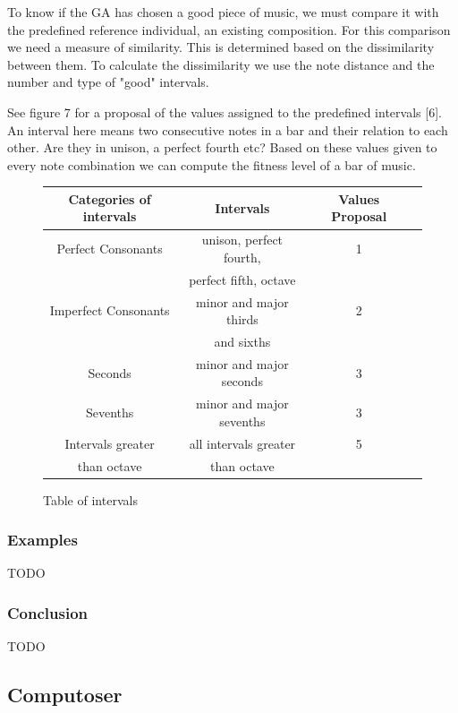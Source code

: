 \documentclass[12pt]{article}
\begin{document}
To know if the GA has chosen a good piece of music, we must compare it with the predefined reference individual, an existing composition. For this comparison we need a measure of similarity. This is determined based on the dissimilarity between them. To calculate the dissimilarity we use the note distance and the number and type of "good" intervals.
\newline
\newline

See figure 7 for a proposal of the values assigned to the predefined intervals [6]. An interval here means two consecutive notes in a bar and their relation to each other. Are they in unison, a perfect fourth etc? Based on these values given to every note combination we can compute the fitness level of a bar of music.

\begin{figure}
\begin{tabular}{| c | c | c | c |}
\hline
\textbf{Categories of intervals} & \textbf{Intervals} & \textbf{Values Proposal} \\
\hline
Perfect Consonants & unison, perfect fourth, & 1  \\ 
& perfect fifth, octave & \\
\hline
Imperfect Consonants & minor and major thirds & 2 \\
& and sixths & \\
\hline
Seconds & minor and major seconds & 3 \\
 \hline
Sevenths & minor and major sevenths & 3 \\
\hline
Intervals greater & all intervals greater & 5 \\
than octave & than octave & \\

\hline
\end{tabular}
\caption{Table of intervals}
\end{figure}

\subsubsection{Examples}

TODO

\subsubsection{Conclusion}

TODO

\subsection{Computoser}
\end{document}
